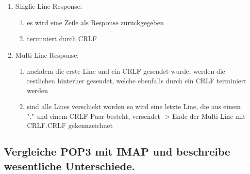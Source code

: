 \documentclass[11pt]{article}
\begin{document}
    \begin{enumerate}
        \item Singlie-Line Response:
        \begin{enumerate}
            \item es wird eine Zeile als Response zurückgegeben
            \item terminiert durch CRLF
        \end{enumerate}
        \item Multi-Line Response:
        \begin{enumerate}
            \item nachdem die erste Line und ein CRLF gesendet wurde, werden die restlichen
            hinterher gesendet, welche ebenfalls durch ein CRLF terminiert werden
            \item sind alle Lines verschickt worden so wird eine letzte Line, die aus einem "."
            und einem CRLF-Paar besteht, versendet -> Ende der Multi-Line mit CRLF.CRLF gekennzeichnet
        \end{enumerate}
    \end{enumerate}

    \subsection{Vergleiche POP3 mit IMAP und beschreibe wesentliche Unterschiede.}
\end{document}
